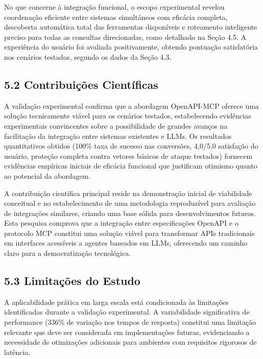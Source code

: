 \documentclass[
]{article}
\begin{document}
No que concerne à integração funcional, o escopo experimental revelou
coordenação eficiente entre sistemas simultâneos com eficácia completa,
descoberta automática total das ferramentas disponíveis e roteamento
inteligente preciso para todas as consultas direcionadas, como detalhado
na Seção 4.5. A experiência do usuário foi avaliada positivamente,
obtendo pontuação satisfatória nos cenários testados, segundo os dados
da Seção 4.3.

\subsection{5.2 Contribuições
Científicas}\label{contribuiuxe7uxf5es-cientuxedficas}

A validação experimental confirma que a abordagem OpenAPI-MCP oferece
uma solução tecnicamente viável para os cenários testados, estabelecendo
evidências experimentais convincentes sobre a possibilidade de grandes
avanços na facilitação da integração entre sistemas existentes e LLMs.
Os resultados quantitativos obtidos (100\% taxa de sucesso nas
conversões, 4,0/5,0 satisfação do usuário, proteção completa contra
vetores básicos de ataque testados) fornecem evidências empíricas
iniciais de eficácia funcional que justificam otimismo quanto ao
potencial da abordagem.

A contribuição científica principal reside na demonstração inicial de
viabilidade conceitual e no estabelecimento de uma metodologia
reproduzível para avaliação de integrações similares, criando uma base
sólida para desenvolvimentos futuros. Esta pesquisa comprova que a
integração entre especificações OpenAPI e o protocolo MCP constitui uma
solução viável para transformar APIs tradicionais em interfaces
acessíveis a agentes baseados em LLMs, oferecendo um caminho claro para
a democratização tecnológica.

\subsection{5.3 Limitações do Estudo}\label{limitauxe7uxf5es-do-estudo}

A aplicabilidade prática em larga escala está condicionada às limitações
identificadas durante a validação experimental. A variabilidade
significativa de performance (336\% de variação nos tempos de resposta)
constitui uma limitação relevante que deve ser considerada em
implementações futuras, evidenciando a necessidade de otimizações
adicionais para ambientes com requisitos rigorosos de latência.
\end{document}
